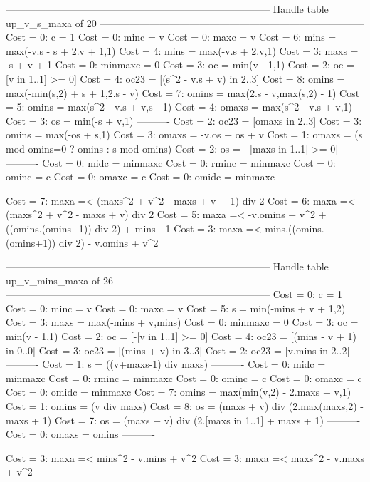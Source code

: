 --------------------------------------------------------------------------------
Handle table up_v_s_maxa of 20
--------------------------------------------------------------------------------
Cost =  0:  c       = 1
Cost =  0:  minc    = v
Cost =  0:  maxc    = v
Cost =  6:  mins    = max(-v.s - s + 2.v + 1,1)
Cost =  4:  mins    = max(-v.s + 2.v,1)
Cost =  3:  maxs    = -s + v + 1
Cost =  0:  minmaxc = 0
Cost =  3:  oc      = min(v - 1,1)
Cost =  2:  oc      = [-[v in 1..1] >= 0]
Cost =  4:  oc23    = [(s^2 - v.s + v) in 2..3]
Cost =  8:  omins   = max(-min(s,2) + s + 1,2.s - v)
Cost =  7:  omins   = max(2.s - v,max(s,2) - 1)
Cost =  5:  omins   = max(s^2 - v.s + v,s - 1)
Cost =  4:  omaxs   = max(s^2 - v.s + v,1)
Cost =  3:  os      = min(-s + v,1)
----------
Cost =  2:  oc23    = [omaxs in 2..3]
Cost =  3:  omins   = max(-os + s,1)
Cost =  3:  omaxs   = -v.os + os + v
Cost =  1:  omaxs   = (s mod omins=0 ? omins : s mod omins)
Cost =  2:  os      = [-[maxs in 1..1] >= 0]
----------
Cost =  0:  midc    = minmaxc
Cost =  0:  rminc   = minmaxc
Cost =  0:  ominc   = c
Cost =  0:  omaxc   = c
Cost =  0:  omidc   = minmaxc
----------

Cost =  7:  maxa =< (maxs^2 + v^2 - maxs + v + 1) div 2
Cost =  6:  maxa =< (maxs^2 + v^2 - maxs + v) div 2
Cost =  5:  maxa =< -v.omins + v^2 + ((omins.(omins+1)) div 2) + mins - 1
Cost =  3:  maxa =< mins.((omins.(omins+1)) div 2) - v.omins + v^2

--------------------------------------------------------------------------------
Handle table up_v_mins_maxa of 26
--------------------------------------------------------------------------------
Cost =  0:  c       = 1
Cost =  0:  minc    = v
Cost =  0:  maxc    = v
Cost =  5:  s       = min(-mins + v + 1,2)
Cost =  3:  maxs    = max(-mins + v,mins)
Cost =  0:  minmaxc = 0
Cost =  3:  oc      = min(v - 1,1)
Cost =  2:  oc      = [-[v in 1..1] >= 0]
Cost =  4:  oc23    = [(mins - v + 1) in 0..0]
Cost =  3:  oc23    = [(mins + v) in 3..3]
Cost =  2:  oc23    = [v.mins in 2..2]
----------
Cost =  1:  s       = ((v+maxs-1) div maxs)
----------
Cost =  0:  midc    = minmaxc
Cost =  0:  rminc   = minmaxc
Cost =  0:  ominc   = c
Cost =  0:  omaxc   = c
Cost =  0:  omidc   = minmaxc
Cost =  7:  omins   = max(min(v,2) - 2.maxs + v,1)
Cost =  1:  omins   = (v div maxs)
Cost =  8:  os      = (maxs + v) div (2.max(maxs,2) - maxs + 1)
Cost =  7:  os      = (maxs + v) div (2.[maxs in 1..1] + maxs + 1)
----------
Cost =  0:  omaxs   = omins
----------

Cost =  3:  maxa =< mins^2 - v.mins + v^2
Cost =  3:  maxa =< maxs^2 - v.maxs + v^2

